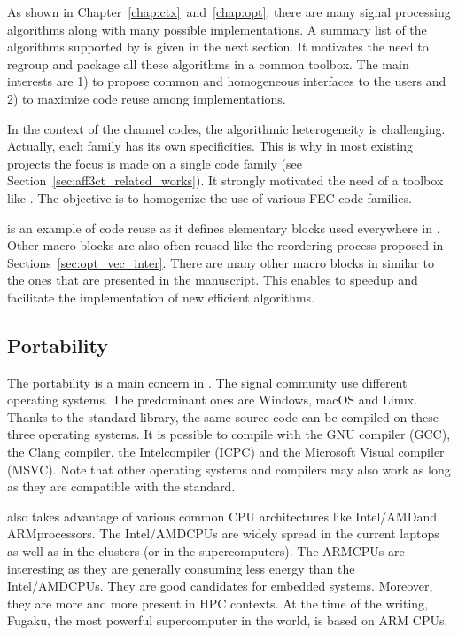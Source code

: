 As shown in Chapter~\ref{chap:ctx}~and~\ref{chap:opt}, there are many signal
processing algorithms along with many possible implementations. A summary list
of the algorithms supported by \AFFECT is given in the next section. It
motivates the need to regroup and package all these algorithms in a common
toolbox. The main interests are 1) to propose common and homogeneous interfaces
to the users and 2) to maximize code reuse among implementations.

In the context of the channel codes, the algorithmic heterogeneity is
challenging. Actually, each family has its own specificities. This is why in
most existing projects the focus is made on a single code family (see
Section~\ref{sec:aff3ct_related_works}). It strongly motivated the need of a
toolbox like \AFFECT. The objective is to homogenize the use of various FEC code
families.

\MIPP is an example of code reuse as it defines elementary blocks used
everywhere in \AFFECT. Other macro blocks are also often reused like the
reordering process proposed in Sections~\ref{sec:opt_vec_inter}. There are many
other macro blocks in \AFFECT similar to the ones that are presented in the
manuscript. This enables to speedup and facilitate the implementation of new
efficient algorithms.

\subsection{Portability}

The portability is a main concern in \AFFECT. The signal community use different
operating systems. The predominant ones are Windows, macOS and Linux. Thanks to
the  standard library, the same \AFFECT source code can be compiled on
these three operating systems. It is possible to compile with the GNU compiler
(GCC), the Clang compiler, the Intel\R \Cxx compiler (ICPC) and the Microsoft\R
Visual compiler (MSVC). Note that other operating systems and compilers may also
work as long as they are compatible with the  standard.

\AFFECT also takes advantage of various common CPU architectures like
Intel\R/AMD\R and ARM\R processors. The Intel\R/AMD\R CPUs are widely spread
in the current laptops as well as in the clusters (or in the supercomputers).
The ARM\R CPUs are interesting as they are generally consuming less energy than
the Intel\R/AMD\R CPUs. They are good candidates for embedded systems. Moreover,
they are more and more present in HPC contexts. At the time of the writing,
Fugaku, the most powerful supercomputer in the world, is based on ARM CPUs.

